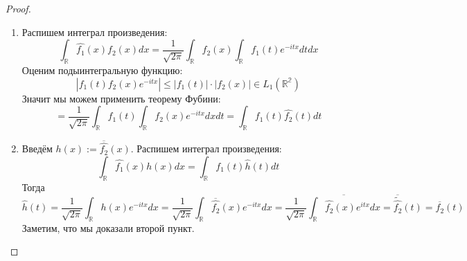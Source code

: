 \documentclass[a4paper,12pt]{article}
\renewcommand{\leq}{\ensuremath{\leqslant}}
\theoremstyle{plain}
\theoremstyle{definition}
\theoremstyle{remark}
\begin{document}
\begin{proof}
	\begin{enumerate}
		\item Распишем интеграл произведения:
		      \[
			      \int_\mathbb{R}\hat{f_1}(x)f_2(x)dx = \frac{1}{\sqrt{2\pi}}\int_\mathbb{R}f_2(x)\int_\mathbb{R}f_1(t)e^{-itx}dtdx
		      \]
		      Оценим подыинтегральную функцию:
		      \[|f_1(t)f_2(x)e^{-itx}| \leq |f_1(t)|\cdot|f_2(x)| \in L_1(\mathbb{R^2})\]
		      Значит мы можем применить теорему Фубини:
		      \[= \frac{1}{\sqrt{2\pi}}\int_\mathbb{R}f_1(t)\int_\mathbb{R}f_2(x)e^{-itx}dxdt = \int_\mathbb{R}f_1(t)\hat{f_2}(t)dt\]
		\item Введём $h(x) := \overline{\hat{f_2}}(x)$. Распишем интеграл произведения:
					\[
						\int_\mathbb{R}\hat{f_1}(x)h(x)dx = \int_\mathbb{R}f_1(t)\hat{h}(t)dt
					\]
					Тогда
					\[
						\hat{h}(t) = \frac{1}{\sqrt{2\pi}}\int_\mathbb{R}h(x)e^{-itx}dx = \frac{1}{\sqrt{2\pi}}\int_\mathbb{R}\overline{\hat{f_2}}(x)e^{-itx}dx = \frac{1}{\sqrt{2\pi}}\overline{\int_\mathbb{R}\hat{f_2}(x)e^{itx}dx} = \overline{\tilde{\hat{f_2}}}(t) = \overline{f_2}(t)
					\]
					Заметим, что мы доказали второй пункт.
	\end{enumerate}
\end{proof}
\end{document}

